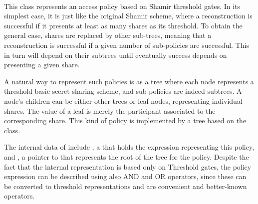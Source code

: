 \documentclass{article}
\begin{document}
\paragraph{\cShTreeAP}

This class represents an access policy based on Shamir threshold gates. In its simplest case, it is just like the original Shamir scheme, where a reconstruction is successful if it presents at least as many shares as its threshold. To obtain the general case, shares are replaced by other sub-trees, meaning that a reconstruction is successful if a given number of sub-policies are successful. This in turn will depend on their subtrees until eventually success depends on presenting a given share.

A natural way to represent such policies is as a tree where each node represents a threshold basic secret sharing scheme, and sub-policies are indeed subtrees. A node's children can be either other trees or leaf nodes, representing individual shares. The value of a leaf is merely the participant associated to the corresponding share. 
This kind of policy is implemented by a tree based on the \ctree class.

The internal data of \cShTreeAP include , a \cstring that holds the expression representing this policy, and , a pointer to \ctree that represents the root of the tree for the policy. Despite the fact that the internal representation is based only on Threshold gates, the policy expression can be described using also AND and OR operators, since these can be converted to threshold representations and are convenient and better-known operators.
\end{document}
